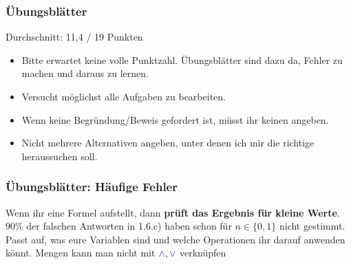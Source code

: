 
\newcommand{\mydate}{18.11.2016}

\newcommand{\handout}{}




\graphicspath{{../figures/}}



\begin{frame}
	\frametitle{Übungsblätter}
	
	Durchschnitt: 11,4 / 19 Punkten
	
	\begin{itemize}
		\item Bitte erwartet keine volle Punktzahl. Übungsblätter sind dazu da, Fehler zu machen und daraus zu lernen.\\
		\item Versucht möglichst alle Aufgaben zu bearbeiten.\\
		\item Wenn keine Begründung/Beweis gefordert ist, müsst ihr keinen angeben.\\
		\item Nicht mehrere Alternativen angeben, unter denen ich mir die richtige heraussuchen soll.
	\end{itemize}
	
	
\end{frame}

\begin{frame}
	\frametitle{Übungsblätter: Häufige Fehler}
	
	\begin{itemize}
	\end{itemize}

	\pause[9]
	Wenn ihr eine Formel aufstellt, dann \textbf{prüft das Ergebnis für kleine Werte}.\\[0.2em]
	$90 \% $ der falschen Antworten in 1.6.c) haben schon für $n \in \{0, 1\}$ nicht gestimmt.\\[0.5em]
	
	\pause[10]
	Passt auf, was eure Variablen sind und welche Operationen ihr darauf anwenden könnt. Mengen kann man nicht mit $\textcolor{blue}{\wedge}\text{}, \textcolor{blue}{\vee}\text{}$ verknüpfen
\end{frame}

